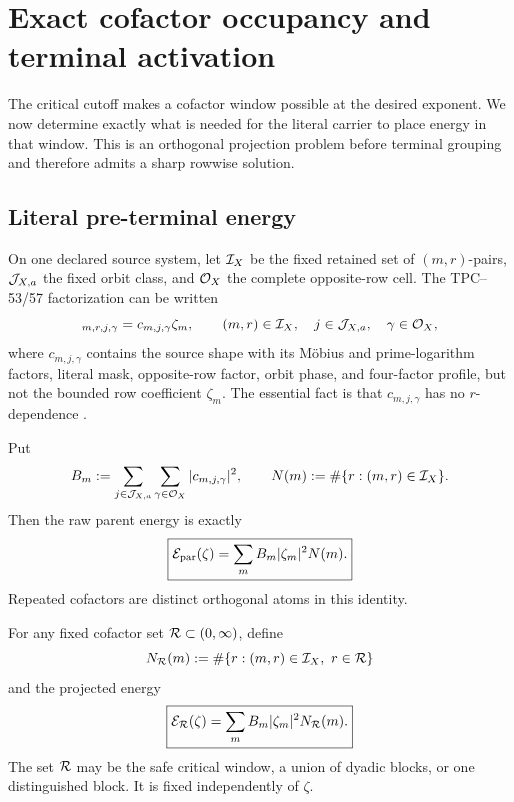 \section{Exact cofactor occupancy and terminal activation}
\label{sec:tpc59-occupancy}

The critical cutoff makes a cofactor window possible at the desired
exponent.  We now determine exactly what is needed for the literal carrier
to place energy in that window.  This is an orthogonal projection problem
before terminal grouping and therefore admits a sharp rowwise solution.

\subsection{Literal pre-terminal energy}

On one declared source system, let \(\mathcal I_X\) be the fixed retained set of
\((m,r)\)-pairs, \(\mathcal J_{X,a}\) the fixed orbit class, and \(\mathcal O_X\) the
complete opposite-row cell.  The TPC--53/57 factorization can be written
\begin{equation}
 [G_X^L]_{m,r,j,\gamma}
 =c_{m,j,\gamma}\zeta_m,
 \qquad
 (m,r)\in\cI_X,\quad j\in\cJ_{X,a},\quad\gamma\in\cO_X,
 \label{eq:tpc59-literal-preterminal-factorization}
\end{equation}
where \(c_{m,j,\gamma}\) contains the source shape with its M\"obius and
prime-logarithm factors, literal mask, opposite-row factor, orbit phase, and
four-factor profile, but not the bounded row coefficient \(\zeta_m\).  The
essential fact is that \(c_{m,j,\gamma}\) has no \(r\)-dependence
\citep{WangTPC53,WangTPC57}.

Put
\begin{equation}
 B_m:=\sum_{j\in\mathcal J_{X,a}}\sum_{\gamma\in\mathcal O_X}
       |c_{m,j,\gamma}|^2,
 \qquad
 N(m):=\#\{r:(m,r)\in\mathcal I_X\}.
 \label{eq:tpc59-Bm-Nm}
\end{equation}
Then the raw parent energy is exactly
\begin{equation}
 \boxed{
 \mathcal E_{\rm par}(\zeta)
 =\sum_mB_m|\zeta_m|^2N(m).}
 \label{eq:tpc59-parent-energy}
\end{equation}
Repeated cofactors are distinct orthogonal atoms in this identity.

For any fixed cofactor set \(\mathcal R\subset(0,\infty)\), define
\begin{equation}
 N_{\mathcal R}(m)
 :=\#\{r:(m,r)\in\mathcal I_X,\ r\in\mathcal R\}
 \label{eq:tpc59-compatible-row-multiplicity}
\end{equation}
and the projected energy
\begin{equation}
 \boxed{
 \mathcal E_{\mathcal R}(\zeta)
 =\sum_mB_m|\zeta_m|^2N_{\mathcal R}(m).}
 \label{eq:tpc59-compatible-energy}
\end{equation}
The set \(\mathcal R\) may be the safe critical window, a union of dyadic blocks,
or one distinguished block.  It is fixed independently of \(\zeta\).

